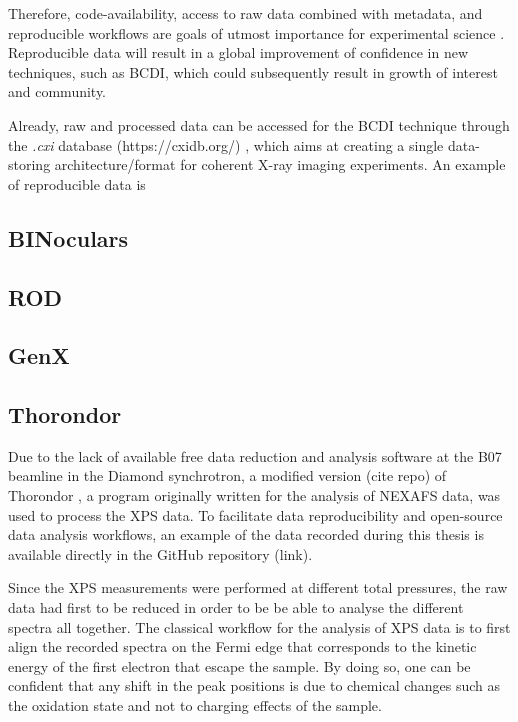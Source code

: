 Therefore, code-availability, access to raw data combined with metadata, and reproducible workflows are goals of utmost importance for experimental science \parencite{Munafo2017}.
Reproducible data will result in a global improvement of confidence in new techniques, such as BCDI, which could subsequently result in growth of interest and community.

Already, raw and processed data can be accessed for the BCDI technique through the \textit{.cxi} database (https://cxidb.org/) \parencite{Maia2012}, which aims at creating a single data-storing architecture/format for coherent X-ray imaging experiments.
An example of reproducible data is

\subsection{BINoculars} \label{sec:BINoculars}

\subsection{ROD} \label{sec:ROD}

\subsection{GenX} \label{sec:GenX}

\subsection{Thorondor} \label{sec:Thorondor}

Due to the lack of available free data reduction and analysis software at the B07 beamline in the Diamond synchrotron, a modified version (cite repo) of Thorondor \parencite{Simonne2020}, a program originally written for the analysis of NEXAFS data, was used to process the XPS data.
To facilitate data reproducibility and open-source data analysis workflows, an example of the data recorded during this thesis is available directly in the GitHub repository (link).

Since the XPS measurements were performed at different total pressures, the raw data had first to be reduced in order to be be able to analyse the different spectra all together.
The classical workflow for the analysis of XPS data is to first align the recorded spectra on the Fermi edge that corresponds to the kinetic energy of the first electron that escape the sample.
By doing so, one can be confident that any shift in the peak positions is due to chemical changes such as the oxidation state and not to charging effects of the sample.

